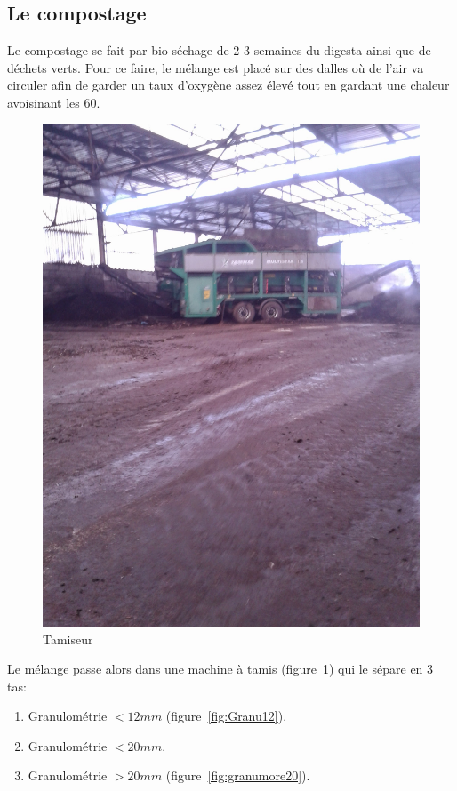 \documentclass{article}
\begin{document}
\subsection{Le compostage}
Le compostage se fait par bio-séchage de 2-3 semaines du digesta ainsi que de déchets verts. Pour ce faire, le mélange est placé sur des dalles où de l'air va circuler afin de garder un taux d'oxygène assez élevé tout en gardant une chaleur avoisinant les \unit{60}{\degree}.
\begin{figure}
  \centering
  \includegraphics[scale=0.07]{IMG_20141105_102726.jpg}
  \caption{Tamiseur}
  \label{fig:tamiseur}
\end{figure}
Le mélange passe alors dans une machine à tamis (figure~\ref{fig:tamiseur}) qui le sépare en 3 tas:
\begin{enumerate}
\item Granulométrie $< \unit{12}{mm}$ (figure~\ref{fig:Granu12}).
\item Granulométrie $< \unit{20}{mm}$.
\item Granulométrie $> \unit{20}{mm}$ (figure~\ref{fig:granumore20}).
\end{enumerate}
\end{document}
